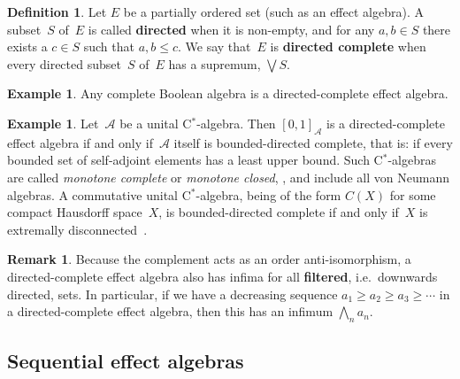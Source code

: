 \documentclass[a4paper, onecolumn, accepted=2020-12-22]{quantumarticle}
\newcommand\Define[1]{\textbf{#1}}
\newcounter{counter}
\theoremstyle{definition}
\newtheorem{definition}[counter]{Definition}
\newtheorem{example}[counter]{Example}
\newtheorem{remark}[counter]{Remark}
\begin{document}
\begin{definition}
    Let $E$ be a partially ordered set (such as an effect algebra).
    A subset~$S$ of~$E$ is called \Define{directed}
    when it is non-empty,
    and for any  $a,b\in S$ there exists a $c\in
    S$ such that $a,b\leq c$. We say that~$E$ is \Define{directed complete} when
    every directed subset~$S$ of~$E$ has a supremum, $\bigvee S$.
\end{definition}

\begin{example}
Any complete Boolean algebra is a directed-complete
effect algebra.
\end{example}

\begin{example}
    Let~$\mathscr{A}$ be a unital C$^*$-algebra.
Then $[0,1]_{\mathscr{A}}$ is a directed-complete effect algebra
    if and only if~$\mathscr{A}$
    itself  is bounded-directed complete, that is: if every
    bounded set of self-adjoint elements has a least upper bound.
Such C$^*$-algebras are called \emph{monotone complete}
    or \emph{monotone closed}, \cite[\S2]{kadison1971equivalence},
    and include all von Neumann algebras.
A commutative unital C$^*$-algebra,
    being of the form $C(X)$ for some compact Hausdorff space~$X$,
    is bounded-directed complete
    if and only if~$X$ is extremally disconnected~\cite[Sections~1H \& 3N.6]{gillman2013rings}.
\end{example}

\begin{remark}\label{remark:infima}
	Because the complement acts as an order anti-isomorphism,
	a directed-complete effect algebra also has infima for all
	\Define{filtered}, i.e.~downwards directed, sets. In
	particular, if we have a decreasing sequence $a_1\geq a_2\geq
	a_3\geq \cdots$ in a directed-complete effect algebra, then
	this has an infimum $\bigwedge_n a_n$.
\end{remark}

\subsection{Sequential effect algebras}
\end{document}
